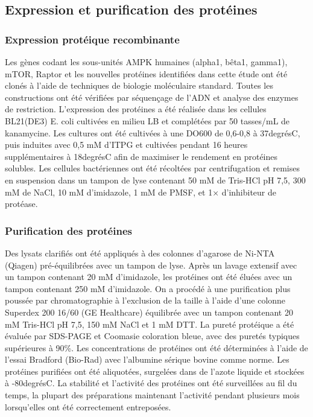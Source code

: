 \documentclass[11pt,a4paper]{article}
\begin{document}
\subsection{Expression et purification des protéines}

\subsubsection{Expression protéique recombinante}

Les gènes codant les sous-unités AMPK humaines (alpha1, bêta1, gamma1), mTOR, Raptor et les nouvelles protéines identifiées dans cette étude ont été clonés à l'aide de techniques de biologie moléculaire standard. Toutes les constructions ont été vérifiées par séquençage de l'ADN et analyse des enzymes de restriction. L'expression des protéines a été réalisée dans les cellules BL21(DE3) E. coli cultivées en milieu LB et complétées par 50 tasses/mL de kanamycine. Les cultures ont été cultivées à une DO600 de 0,6-0,8 à 37degrésC, puis induites avec 0,5 mM d'ITPG et cultivées pendant 16 heures supplémentaires à 18degrésC afin de maximiser le rendement en protéines solubles. Les cellules bactériennes ont été récoltées par centrifugation et remises en suspension dans un tampon de lyse contenant 50 mM de Tris-HCl pH 7,5, 300 mM de NaCl, 10 mM d'imidazole, 1 mM de PMSF, et 1× d'inhibiteur de protéase.

\subsubsection{Purification des protéines}

Des lysats clarifiés ont été appliqués à des colonnes d'agarose de Ni-NTA (Qiagen) pré-équilibrées avec un tampon de lyse. Après un lavage extensif avec un tampon contenant 20 mM d'imidazole, les protéines ont été éluées avec un tampon contenant 250 mM d'imidazole. On a procédé à une purification plus poussée par chromatographie à l'exclusion de la taille à l'aide d'une colonne Superdex 200 16/60 (GE Healthcare) équilibrée avec un tampon contenant 20 mM Tris-HCl pH 7,5, 150 mM NaCl et 1 mM DTT. La pureté protéique a été évaluée par SDS-PAGE et Coomasie coloration bleue, avec des puretés typiques supérieures à 90\%. Les concentrations de protéines ont été déterminées à l'aide de l'essai Bradford (Bio-Rad) avec l'albumine sérique bovine comme norme. Les protéines purifiées ont été aliquotées, surgelées dans de l'azote liquide et stockées à -80degrésC. La stabilité et l'activité des protéines ont été surveillées au fil du temps, la plupart des préparations maintenant l'activité pendant plusieurs mois lorsqu'elles ont été correctement entreposées.
\end{document}
